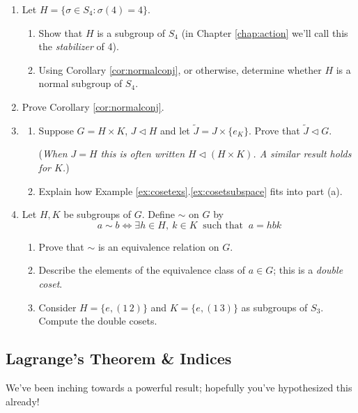 \begin{exercises}{}{}
\begin{enumerate}
	
		\item Let $H=\{\sigma\in S_4:\sigma(4)=4\}$.
		\begin{enumerate}
		  \item Show that $H$ is a subgroup of $S_4$ (in Chapter \ref{chap:action} we'll call this the \emph{stabilizer} of 4).
		  \item Using Corollary \ref{cor:normalconj}, or otherwise, determine whether $H$ is a normal subgroup of $S_4$.
		\end{enumerate}
		
		
		\item Prove Corollary \ref{cor:normalconj}.
	  
	  
	  \item\label{exs:directprodfactor}\begin{enumerate}
	    \item Suppose $G=H\times K$, $J\triangleleft H$ and let $\widetilde J=J\times\{e_K\}$. Prove that $\widetilde J\triangleleft G$.\par
	    (\emph{When $J=H$ this is often written $H\triangleleft (H\times K)$. A similar result holds for $K$.})
	    \item Explain how Example \ref*{ex:cosetexs}.\ref{ex:cosetsubspace} fits into part (a).
	  \end{enumerate} 
	  
		
		\item Let $H,K$ be subgroups of $G$. Define $\sim$ on $G$ by
		\[
			a\sim b\iff \exists h\in H,\ k\in K \ \text{ such that }\ a=hb k
		\]
		\begin{enumerate}
	  	\item Prove that $\sim$ is an equivalence relation on $G$.
	  	\item Describe the elements of the equivalence class of $a\in G$; this is a \emph{double coset}.
	  	\item Consider $H=\{e,(1\,2)\}$ and $K=\{e,(1\,3)\}$ as subgroups of $S_3$. Compute the double cosets.
		\end{enumerate}
	\end{enumerate}
\end{exercises}


\clearpage


\subsection{Lagrange's Theorem \& Indices}\label{sec:lagrange}


We've been inching towards a powerful result; hopefully you've hypothesized this already!

